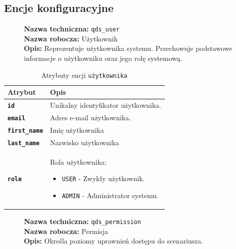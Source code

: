\subsection{Encje konfiguracyjne}

\begin{figure}[H]
    \centering
    \begin{minipage}{0.8\textwidth}
        \begin{framed}
            \noindent\textbf{\large Nazwa techniczna:} \texttt{qds\_user} \\
            \textbf{\large Nazwa robocza:} Użytkownik \\
            \textbf{\large Opis:} Reprezentuje użytkownika systemu. Przechowuje podstawowe informacje o użytkowniku
            oraz jego rolę systemową.
        \end{framed}
    \end{minipage}
\end{figure}

\begin{table}[H]
    \centering
    \renewcommand{\arraystretch}{1.6}
    \begin{tabular}{|>{\bfseries}l|p{}|}
        \hline
        \rowcolor[HTML]{EFEFEF} \textbf{Atrybut} & \textbf{Opis} \\
        \hline
        \texttt{id} & Unikalny identyfikator użytkownika. \\
        \hline
        \texttt{email} & Adres e-mail użytkownika. \\
        \hline
        \texttt{first\_name} & Imię użytkownika \\
        \hline
        \texttt{last\_name} & Nazwisko użytkownika \\
        \hline
        \texttt{role} & Rola użytkownika:
        \begin{itemize}
            \item \texttt{USER} - Zwykły użytkownik.
            \item \texttt{ADMIN} - Administrator systemu.
        \end{itemize} \\
        \hline
    \end{tabular}
    \caption{Atrybuty encji \texttt{użytkownika}}
\end{table}

\begin{figure}[H]
    \centering
    \begin{minipage}{0.8\textwidth}
        \begin{framed}
            \noindent\textbf{\large Nazwa techniczna:} \texttt{qds\_permission} \\
            \textbf{\large Nazwa robocza:} Permisja \\
            \textbf{\large Opis:} Określa poziomy uprawnień dostępu do scenariusza.
        \end{framed}
    \end{minipage}
\end{figure}

